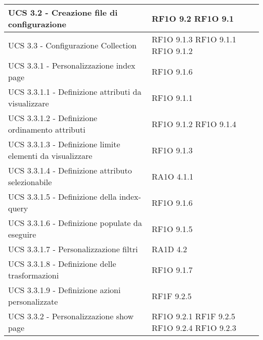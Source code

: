 \begin{center}
\begin{longtable}{ | p{5cm} | p{5cm} |}
						UCS 3.2  - Creazione file di configurazione &  RF1O 9.2 \newline  RF1O 9.1 \newline  \\ \hline      
						UCS 3.3  - Configurazione Collection &  RF1O 9.1.3 \newline  RF1O 9.1.1 \newline  RF1O 9.1.2 \newline  \\ \hline      
						UCS 3.3.1 - Personalizzazione index page &  RF1O 9.1.6 \newline  \\ \hline      
						UCS 3.3.1.1  - Definizione attributi da visualizzare &  RF1O 9.1.1 \newline  \\ \hline      
						UCS 3.3.1.2  -  Definizione ordinamento attributi &  RF1O 9.1.2 \newline  RF1O 9.1.4 \newline  \\ \hline      
						UCS 3.3.1.3  - Definizione limite elementi da visualizzare &  RF1O 9.1.3 \newline  \\ \hline      
						UCS 3.3.1.4 - Definizione attributo selezionabile &  RA1O 4.1.1 \newline  \\ \hline      
						UCS 3.3.1.5 - Definizione della index-query &  RF1O 9.1.6 \newline  \\ \hline      
						UCS 3.3.1.6 - Definizione populate da eseguire &  RF1O 9.1.5 \newline  \\ \hline      
						UCS 3.3.1.7 - Personalizzazione filtri &  RA1D 4.2 \newline  \\ \hline      
						UCS 3.3.1.8 - Definizione delle trasformazioni &  RF1O 9.1.7 \newline  \\ \hline      
						UCS 3.3.1.9 - Definizione azioni personalizzate &  RF1F 9.2.5 \newline  \\ \hline      
						UCS 3.3.2  -  Personalizzazione show page &  RF1O 9.2.1 \newline  RF1F 9.2.5 \newline  RF1O 9.2.4 \newline  RF1O 9.2.3 \newline  \\ \hline      

\end{longtable}
\end{center}
